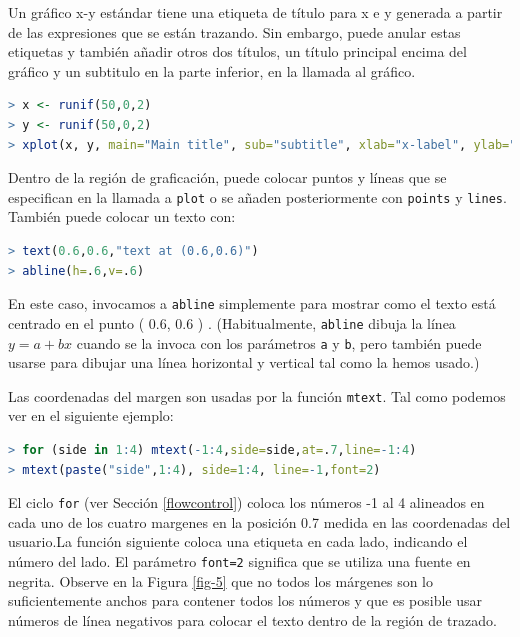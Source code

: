 Un gráfico x-y estándar tiene una etiqueta de título para x e y generada a
partir de las expresiones que se están trazando. Sin embargo, puede anular estas
etiquetas y también añadir otros dos títulos, un título principal encima del
gráfico y un subtitulo en la parte inferior, en la llamada al gráfico.

\begin{lstlisting}[language=R]
> x <- runif(50,0,2)
> y <- runif(50,0,2)
> xplot(x, y, main="Main title", sub="subtitle", xlab="x-label", ylab="y-label")
\end{lstlisting}

Dentro de la región de graficación, puede colocar puntos y líneas que se especifican
en la llamada a \texttt{plot} o se añaden posteriormente con \texttt{points} y
\texttt{lines}. También puede colocar un texto con:

\begin{lstlisting}[language=R]
> text(0.6,0.6,"text at (0.6,0.6)")
> abline(h=.6,v=.6)
\end{lstlisting}

En este caso, invocamos a \texttt{abline} simplemente para mostrar como el
texto está centrado en el punto ( 0.6, 0.6 ) . (Habitualmente, \texttt{abline}
dibuja la línea $y = a + bx$ cuando se la invoca con los parámetros \texttt{a}
y \texttt{b}, pero también puede usarse para dibujar una línea horizontal y
vertical tal como la hemos usado.)

Las coordenadas del margen son usadas por la función \texttt{mtext}. Tal como
podemos ver en el siguiente ejemplo:

\begin{lstlisting}[language=R]
> for (side in 1:4) mtext(-1:4,side=side,at=.7,line=-1:4)
> mtext(paste("side",1:4), side=1:4, line=-1,font=2)
\end{lstlisting}

El ciclo \texttt{for} (ver Sección \ref{flowcontrol}) coloca los números -1 al 4
alineados en cada uno de los cuatro margenes en la posición 0.7 medida en las
coordenadas del usuario.La función siguiente coloca una etiqueta en cada lado,
indicando el número del lado. El parámetro \texttt{font=2} significa que se
utiliza una fuente en negrita. Observe en la Figura \ref{fig-5} que no todos los
márgenes son lo suficientemente anchos para contener todos los números y que es
posible usar números de línea negativos para colocar el texto dentro de la
región de trazado.

